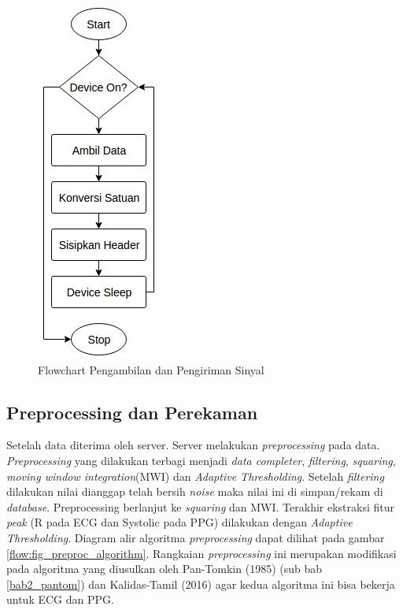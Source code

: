 \begin{figure}[H]
\centering
\includegraphics[scale=0.8]{images/flow_sample.png}
\caption{Flowchart Pengambilan dan Pengiriman Sinyal}
\label{flow:flow_sample}
\end{figure}

\subsection{Preprocessing dan Perekaman}
Setelah data diterima oleh server. Server melakukan \textit{preprocessing} pada data. \textit{Preprocessing} yang dilakukan terbagi menjadi \textit{data completer}, \textit{filtering}, \textit{squaring}, \textit{moving window integration}(MWI) dan \textit{Adaptive Thresholding}. Setelah \textit{filtering} dilakukan nilai dianggap telah bersih \textit{noise} maka nilai ini di simpan/rekam di \textit{database}. Preprocessing berlanjut ke \textit{squaring} dan MWI. Terakhir ekstraksi fitur \textit{peak} (R pada ECG dan Systolic pada PPG) dilakukan dengan \textit{Adaptive Thresholding}. Diagram alir algoritma \textit{preprocessing} dapat dilihat pada gambar \ref{flow:fig_preproc_algorithm}. Rangkaian \textit{preprocessing} ini merupakan modifikasi pada algoritma yang diusulkan oleh Pan-Tomkin (1985) (sub bab \ref{bab2_pantom}) dan Kalidas-Tamil (2016) agar kedua algoritma ini bisa bekerja untuk ECG dan PPG.


